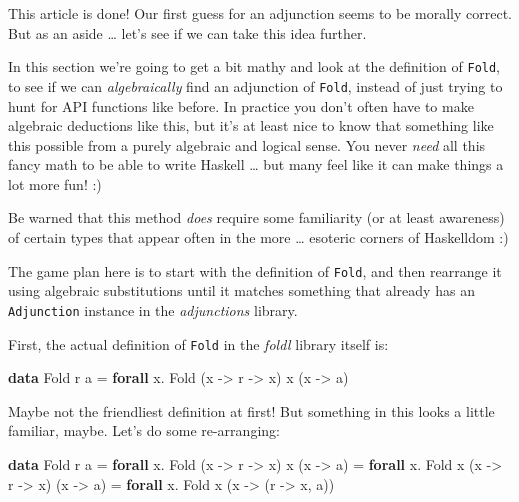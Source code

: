 \documentclass[]{article}
\newenvironment{Shaded}{}{}
\newcommand{\DataTypeTok}[1]{\textcolor[rgb]{0.56,0.13,0.00}{#1}}
\newcommand{\KeywordTok}[1]{\textcolor[rgb]{0.00,0.44,0.13}{\textbf{#1}}}
\newcommand{\NormalTok}[1]{#1}
\newcommand{\OperatorTok}[1]{\textcolor[rgb]{0.40,0.40,0.40}{#1}}
\newcommand{\OtherTok}[1]{\textcolor[rgb]{0.00,0.44,0.13}{#1}}
\begin{document}
This article is done! Our first guess for an adjunction seems to be morally
correct. But as an aside \ldots{} let's see if we can take this idea further.

In this section we're going to get a bit mathy and look at the definition of
\texttt{Fold}, to see if we can \emph{algebraically} find an adjunction of
\texttt{Fold}, instead of just trying to hunt for API functions like before. In
practice you don't often have to make algebraic deductions like this, but it's
at least nice to know that something like this possible from a purely algebraic
and logical sense. You never \emph{need} all this fancy math to be able to write
Haskell \ldots{} but many feel like it can make things a lot more fun! :)

Be warned that this method \emph{does} require some familiarity (or at least
awareness) of certain types that appear often in the more \ldots{} esoteric
corners of Haskelldom :)

The game plan here is to start with the definition of \texttt{Fold}, and then
rearrange it using algebraic substitutions until it matches something that
already has an \texttt{Adjunction} instance in the \emph{adjunctions} library.

First, the actual definition of \texttt{Fold} in the \emph{foldl} library itself
is:

\begin{Shaded}
\begin{Highlighting}[]
\KeywordTok{data} \DataTypeTok{Fold}\NormalTok{ r a }\OtherTok{=} \KeywordTok{forall}\NormalTok{ x}\OperatorTok{.} \DataTypeTok{Fold}\NormalTok{ (x }\OtherTok{{-}>}\NormalTok{ r }\OtherTok{{-}>}\NormalTok{ x) x (x }\OtherTok{{-}>}\NormalTok{ a)}
\end{Highlighting}
\end{Shaded}

Maybe not the friendliest definition at first! But something in this looks a
little familiar, maybe. Let's do some re-arranging:

\begin{Shaded}
\begin{Highlighting}[]
\KeywordTok{data} \DataTypeTok{Fold}\NormalTok{ r a }\OtherTok{=} \KeywordTok{forall}\NormalTok{ x}\OperatorTok{.} \DataTypeTok{Fold}\NormalTok{ (x }\OtherTok{{-}>}\NormalTok{ r }\OtherTok{{-}>}\NormalTok{ x) x (x }\OtherTok{{-}>}\NormalTok{ a)}
              \OtherTok{=} \KeywordTok{forall}\NormalTok{ x}\OperatorTok{.} \DataTypeTok{Fold}\NormalTok{ x (x }\OtherTok{{-}>}\NormalTok{ r }\OtherTok{{-}>}\NormalTok{ x) (x }\OtherTok{{-}>}\NormalTok{ a)}
              \OtherTok{=} \KeywordTok{forall}\NormalTok{ x}\OperatorTok{.} \DataTypeTok{Fold}\NormalTok{ x (x }\OtherTok{{-}>}\NormalTok{ (r }\OtherTok{{-}>}\NormalTok{ x, a))}
\end{Highlighting}
\end{Shaded}
\end{document}
